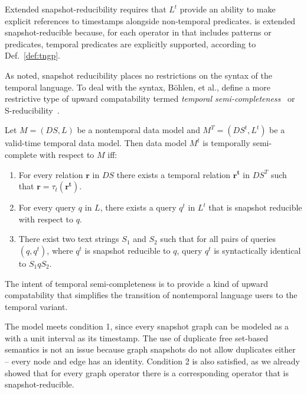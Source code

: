Extended snapshot-reducibility requires that $L^t$ provide an ability
to make explicit references to timestamps alongside non-temporal
predicates.  \tga is extended snapshot-reducible because, for each
operator in \tga that includes patterns or predicates, temporal
predicates are explicitly supported, according to Def.~\ref{def:tngp}.

As noted, snapshot reducibility places no restrictions on the syntax
of the temporal language.  To deal with the syntax, B{\"{o}}hlen, et
al., define a more restrictive type of upward compatability termed {\em
  temporal semi-completeness}~\cite{Bohlen1995} or
S-reducibility~\cite{Bohlen2000}.

\begin{definition} Let $M = (DS,L)$ be a nontemporal data
model and $M^T = (DS^t,L^t)$ be a valid-time temporal data model.
Then data model $M^t$ is temporally semi-complete with respect to $M$
iff:

\begin{enumerate}[noitemsep,itemindent=\dimexpr\labelwidth+\labelsep\relax,leftmargin=7pt]
\item For every relation $\mathbf{r}$ in $DS$ there exists a temporal
  relation $\mathbf{r^t}$ in $DS^T$ such that $\mathbf{r} =
  \tau_t(\mathbf{r^t})$.
\item For every query $q$ in $L$, there exists a query $q^t$ in $L^t$
  that is snapshot reducible with respect to $q$.
\item There exist two text strings $S_1$ and $S_2$ such that for all
  pairs of queries $(q,q^t)$, where $q^t$ is snapshot reducible to
  $q$, query $q^t$ is syntactically identical to $S_1qS_2$.
\end{enumerate}
\end{definition}

The intent of temporal semi-completeness is to provide a kind of
upward compatability that simplifies the transition of nontemporal
language users to the temporal variant.  

The \tg model meets condition 1, since every snapshot graph
  can be modeled as a \tg with a unit interval as its timestamp.  The
  use of duplicate free set-based semantics is not an issue because
  graph snapshots do not allow duplicates either -- every node and
  edge has an identity.  Condition 2 is also satisfied, as we already
  showed that for every graph operator there is a corresponding \tga
  operator that is snapshot-reducible.

